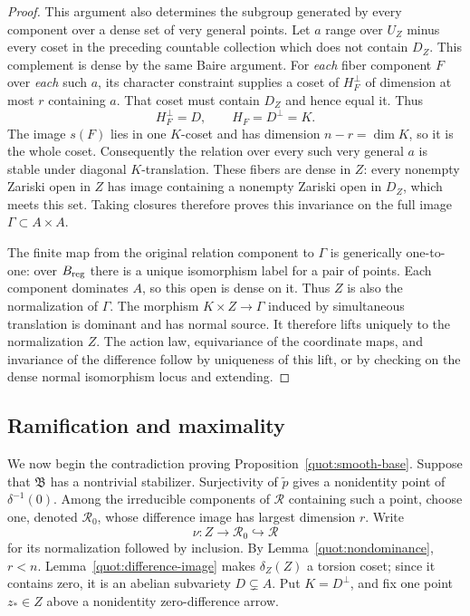 \begin{proof}
This argument also determines the subgroup generated by every
component over a dense set of very general points.  Let \(a\) range
over \(U_Z\) minus every coset in the preceding countable collection
which does not contain \(D_Z\).  This complement is dense by the same
Baire argument.  For \emph{each} fiber component \(F\) over \emph{each}
such \(a\), its character constraint supplies a coset of
\(H_F^\perp\) of dimension at most \(r\) containing \(a\).
That coset must contain \(D_Z\) and hence equal it.
Thus
\[
                         H_F^\perp=D,\qquad H_F=D^\perp=K .
\]
The image \(s(F)\) lies in one \(K\)-coset and has dimension
\(n-r=\dim K\), so it is the whole coset.
Consequently the relation over every such very general \(a\) is
stable under diagonal \(K\)-translation.  These fibers are dense in
\(Z\): every nonempty Zariski open in \(Z\) has image containing a
nonempty Zariski open in \(D_Z\), which meets this set.  Taking closures
therefore proves this invariance on the full image
\(\Gamma\subset A\times A\).

The finite map from the original relation component to \(\Gamma\)
is generically one-to-one: over \(B_{\rm reg}\) there is a unique
isomorphism label for a pair of points.  Each component dominates
\(A\), so this open is dense on it.  Thus \(Z\) is also the
normalization of \(\Gamma\).
The morphism \(K\times Z\to\Gamma\) induced by simultaneous translation
is dominant and has normal source.  It therefore lifts uniquely to
the normalization \(Z\).
The action law, equivariance of the coordinate maps, and invariance
of the difference follow by uniqueness of this lift, or by checking
on the dense normal isomorphism locus and extending.
\end{proof}

\subsection{Ramification and maximality}\label{quot:maximality}

We now begin the contradiction proving
Proposition~\ref{quot:smooth-base}.  Suppose that \(\mathfrak B\) has
a nontrivial stabilizer.  Surjectivity of \(\widetilde p\) gives a
nonidentity point of \(\delta^{-1}(0)\).  Among the irreducible
components of \(\mathcal R\) containing such a point, choose one,
denoted \(\mathcal R_0\), whose difference image has largest
dimension \(r\).  Write
\[
       \nu:Z\longrightarrow\mathcal R_0\hookrightarrow\mathcal R
\]
for its normalization followed by inclusion.  By
Lemma~\ref{quot:nondominance}, \(r<n\).  Lemma~\ref{quot:difference-image}
makes \(\delta_Z(Z)\) a torsion coset; since it contains zero, it is
an abelian subvariety \(D\subsetneq A\).  Put \(K=D^\perp\), and fix
one point \(z_*\in Z\) above a nonidentity zero-difference arrow.

